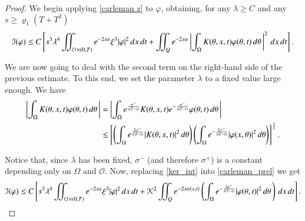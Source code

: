 \documentclass[preprint,1p]{elsarticle}
\newcommand{\intd}{\displaystyle\int \kern -7pt \int}
\begin{document}
\begin{proof}
We begin applying \eqref{carleman z} to $\varphi$, obtaining, for any $\lambda\geq C$ and any $s\geq \varrho_1\left(T + T^2\right)$ 
\begin{align}\label{carleman_prel}
	\mathcal{I}(\varphi) \leq C \left[s^3\lambda^4\intd_{\mathcal O\times(0,T)} e^{-2s\alpha}\xi^3 |\varphi|^2\,dx\,dt + \intd_Q e^{-2s\alpha}\left|\int_{\Omega} K(\theta,x,t)\varphi(\theta,t)\,d\theta\,\right|^2\,dx\,dt\right].
\end{align}

We are now going to deal with the second term on the right-hand side of the previous estimate. To this end, we set the parameter  $\lambda$ to a fixed value large enough. We have
\begin{align}\label{ker_int}
	\left|\int_\Omega K(\theta,x,t)\varphi(\theta,t)\,d\theta\,\right| & = \left|\int_{\Omega} e^{\frac{\sigma^-}{t(T-t)}}K(\theta,x,t)e^{-\frac{\sigma^-}{t(T-t)}}\varphi(\theta,t)\,d\theta\,\right| \notag
	\\	
	&\leq \left[\left(\int_\Omega e^{\frac{2\sigma^-}{t(T-t)}}|K(\theta,x,t)|^2\,d\theta\right)\left(\int_\Omega e^{-\frac{2\sigma^-}{t(T-t)}}|\varphi(x,\theta)|^2\,d\theta\right)\right]^{\frac 12}.
\end{align}

Notice that, since $\lambda$ has been fixed, $\sigma^-$ (and therefore $\sigma^+$) is a constant depending only on $\Omega$ and $\mathcal O$. Now, replacing \eqref{ker_int} into \eqref{carleman_prel} we get
\begin{align*}
	\mathcal{I}(\varphi) \leq C \left[s^3\lambda^4\intd_{\mathcal O\times(0,T)} e^{-2s\alpha}\xi^3 |\varphi|^2\,dx\,dt + \mathcal{K}^2\intd_Q e^{-2s\alpha(x,t)}\left(\int_{\Omega} e^{-\frac{2\sigma^-}{t(T-t)}}|\varphi(\theta,t)|^2\,d\theta\,\right)\,dx\,dt\right].
\end{align*}


\end{proof}
\end{document}
